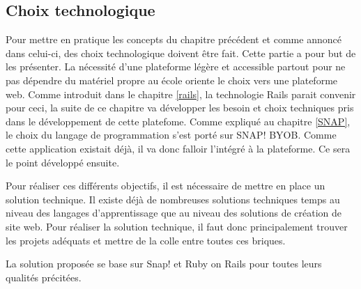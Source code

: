 \subsection{Choix technologique}
Pour mettre en pratique les concepts du chapitre précédent et comme annoncé dans celui-ci, des choix technologique doivent être fait. Cette partie a pour but de les présenter. La nécessité d'une plateforme légère et accessible partout pour ne pas dépendre du matériel propre au école oriente le choix vers une plateforme web. Comme introduit dans le chapitre \ref{rails}, la technologie Rails parait convenir pour ceci, la suite de ce chapitre va développer les besoin et choix techniques pris dans le développement de cette platefome. 
Comme expliqué au chapitre \ref{SNAP}, le choix du langage de programmation s'est porté sur SNAP! BYOB. Comme cette application existait déjà, il va donc falloir l'intégré à la plateforme. Ce sera le point développé ensuite.


Pour réaliser ces différents objectifs, il est nécessaire de mettre en place un solution technique. Il existe déjà de nombreuses solutions techniques temps au niveau des langages d'apprentissage que au niveau des solutions de création de site web. Pour réaliser la solution technique, il faut donc principalement trouver les projets adéquats et mettre de la colle entre toutes ces briques.

La solution proposée se base sur Snap! et Ruby on Rails pour toutes leurs qualités précitées. 
